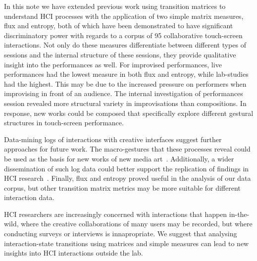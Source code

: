 \documentclass{sigchi}
\begin{document}
In this note we have extended previous work using transition matrices
to understand HCI processes with the application of two simple matrix
measures, flux and entropy, both of which have been demonstrated to
have significant discriminatory power with regards to a corpus of 95
collaborative touch-screen interactions. Not only do these measures
differentiate between different types of sessions and the internal
structure of these sessions, they provide qualitative insight into the
performances as well. For improvised performances, live performances
had the lowest measure in both flux and entropy, while lab-studies had
the highest. This may be due to the increased pressure on performers
when improvising in front of an audience. The internal investigation
of performances session revealed more structural variety in
improvisations than compositions. In response, new works could be
composed that specifically explore different gestural structures in
touch-screen performance.

Data-mining logs of interactions with creative interfaces suggest
further approaches for future work. The macro-gestures that these
processes reveal could be used as the basis for new works of new media
art~\cite{Manovich:2002ly}. Additionally, a wider dissemination of
such log data could better support the replication of findings in HCI
research~\cite{Wilson:2011ve}. Finally, flux and entropy proved useful
in the analysis of our data corpus, but other transition matrix
metrics may be more suitable for different interaction data.

HCI researchers are increasingly concerned with interactions that
happen in-the-wild, where the creative collaborations of many users
may be recorded, but where conducting surveys or interviews is
innapropriate. We suggest that analysing interaction-state transitions
using matrices and simple measures can lead to new insights into HCI
interactions outside the lab.




\end{document}
